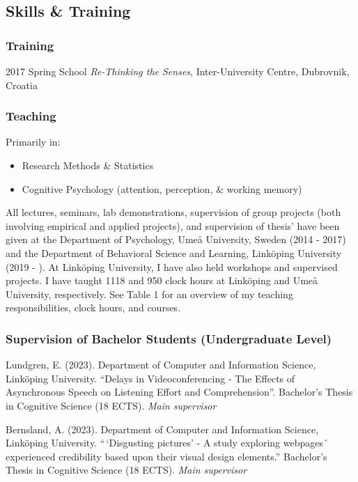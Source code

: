 \documentclass[]{article}
\providecommand{\tightlist}{%
  \setlength{\itemsep}{0pt}\setlength{\parskip}{0pt}}
\begin{document}
\subsection{Skills \& Training}\label{skills-training}

\subsubsection{Training}\label{training}

2017 Spring School \emph{Re-Thinking the Senses}, Inter-University
Centre, Dubrovnik, Croatia

\subsubsection{Teaching}\label{teaching}

Primarily in:

\begin{itemize}
\tightlist
\item
  Research Methods \& Statistics
\item
  Cognitive Psychology (attention, perception, \& working memory)
\end{itemize}

All lectures, seminars, lab demonstrations, supervision of group
projects (both involving empirical and applied projects), and
supervision of thesis' have been given at the Department of Psychology,
Umeå University, Sweden (2014 - 2017) and the Department of Behavioral
Science and Learning, Linköping University (2019 - ). At Linköping
University, I have also held workshops and supervised projects. I have
taught 1118 and 950 clock hours at Linköping and Umeå University,
respectively. See Table 1 for an overview of my teaching
responsibilities, clock hours, and courses.

\subsubsection{Supervision of Bachelor Students (Undergraduate
Level)}\label{supervision-of-bachelor-students-undergraduate-level}

Lundgren, E. (2023). Department of Computer and Information Science,
Linköping University. ``Delays in Videoconferencing - The Effects of
Asynchronous Speech on Listening Effort and Comprehension''. Bachelor's
Thesis in Cognitive Science (18 ECTS). \emph{Main supervisor}

Bernsland, A. (2023). Department of Computer and Information Science,
Linköping University. ``\,`Disgusting pictures' - A study exploring
webpages´ experienced credibility based upon their visual design
elements.'' Bachelor's Thesis in Cognitive Science (18 ECTS). \emph{Main
supervisor}
\end{document}
